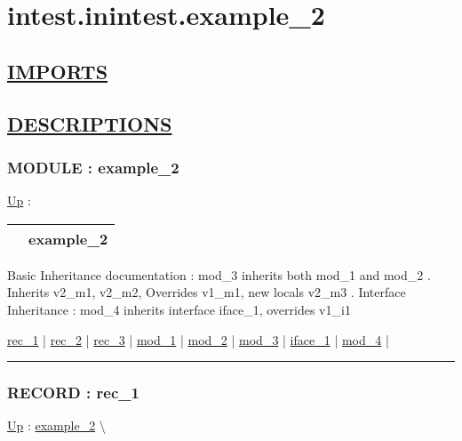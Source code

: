 \chapter*{intest.inintest.example\_2}
\hypertarget{ecldoc:toc:intest.inintest.example_2}{}

\section*{\underline{IMPORTS}}

\section*{\underline{DESCRIPTIONS}}
\subsection*{MODULE : example\_2}
\hypertarget{ecldoc:intest.inintest.example_2}{}
\hyperlink{ecldoc:toc:intest/inintest}{Up} :

{\renewcommand{\arraystretch}{1.5}
\begin{tabularx}{\textwidth}{|>{\raggedright\arraybackslash}l|X|}
\hline
\hspace{0pt} & example\_2 \\
\hline
\end{tabularx}
}

\par
Basic Inheritance documentation : mod\_3 inherits both mod\_1 and mod\_2 . Inherits v2\_m1, v2\_m2, Overrides v1\_m1, new locals v2\_m3 . Interface Inheritance : mod\_4 inherits interface iface\_1, overrides v1\_i1


\hyperlink{ecldoc:intest.inintest.example_2.rec_1}{rec\_1}  |
\hyperlink{ecldoc:intest.inintest.example_2.rec_2}{rec\_2}  |
\hyperlink{ecldoc:intest.inintest.example_2.rec_3}{rec\_3}  |
\hyperlink{ecldoc:intest.inintest.example_2.mod_1}{mod\_1}  |
\hyperlink{ecldoc:intest.inintest.example_2.mod_2}{mod\_2}  |
\hyperlink{ecldoc:intest.inintest.example_2.mod_3}{mod\_3}  |
\hyperlink{ecldoc:intest.inintest.example_2.iface_1}{iface\_1}  |
\hyperlink{ecldoc:intest.inintest.example_2.mod_4}{mod\_4}  |

\rule{\linewidth}{0.5pt}

\subsection*{RECORD : rec\_1}
\hypertarget{ecldoc:intest.inintest.example_2.rec_1}{}
\hyperlink{ecldoc:intest.inintest.example_2}{Up} :
\hspace{0pt} \hyperlink{ecldoc:intest.inintest.example_2}{example_2} \textbackslash 

